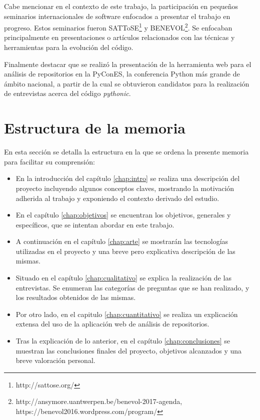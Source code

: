 \documentclass[a4paper, 12pt]{book}
\begin{document}
Cabe mencionar en el contexto de este trabajo, la participación en pequeños seminarios internacionales de software enfocados a presentar el trabajo en progreso. Estos seminarios fueron SATToSE\footnote{http://sattose.org/} y BENEVOL\footnote{http://ansymore.uantwerpen.be/benevol-2017-agenda, https://benevol2016.wordpress.com/program/}. Se enfocaban principalmente en presentaciones o artículos relacionados con las técnicas y herramientas para la evolución del código.

Finalmente destacar que se realizó la presentación de la herramienta web para el análisis de repositorios en la PyConES, la conferencia Python más grande de ámbito nacional, a partir de la cual se obtuvieron candidatos para la realización de entrevistas acerca del código \textit{pythonic}.

\section{Estructura de la memoria}
\label{sec:Estructura}
En esta sección se detalla la estructura en la que se ordena la presente memoria para facilitar su comprensión:
\begin{itemize}

    \item En la introducción del capítulo \ref{chap:intro} se realiza una descripción del proyecto incluyendo algunos conceptos claves, mostrando la motivación adherida al trabajo y exponiendo el contexto derivado del estudio.

    \item En el capítulo \ref{chap:objetivos} se encuentran los objetivos, generales y específicos, que se intentan abordar en este trabajo.

    \item A continuación en el capítulo \ref{chap:arte} se mostrarán las tecnologías utilizadas en el proyecto y una breve pero explicativa descripción de las mismas.

    \item Situado en el capítulo \ref{chap:cualitativo} se explica la realización de las entrevistas. Se enumeran las categorías de preguntas que se han realizado, y los resultados obtenidos de las mismas.

    \item Por otro lado, en el capitulo \ref{chap:cuantitativo} se realiza un explicación extensa del uso de la aplicación web de análisis de repositorios.
    
    \item Tras la explicación de lo anterior, en el capítulo \ref{chap:conclusiones} se muestran las conclusiones finales del proyecto, objetivos alcanzados y una breve valoración personal.
    
\end{itemize}
\end{document}

